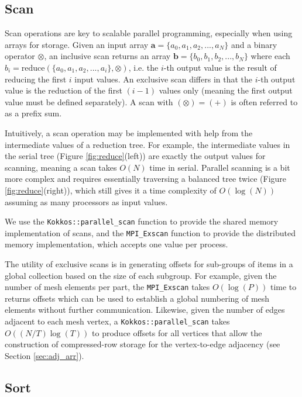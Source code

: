 \subsection{Scan}

Scan operations are key to scalable parallel programming, especially when using
arrays for storage.
Given an input array $\mathbf{a}=\{a_0, a_1, a_2, ..., a_N\}$ and a binary operator
$\otimes$, an inclusive scan returns an array $\mathbf{b}=\{b_0, b_1, b_2, ..., b_N\}$
where each $b_i=\text{reduce}(\{a_0, a_1, a_2, ..., a_i\}, \otimes)$, i.e. the
$i$-th output value is the result of reducing the first $i$ input values.
An exclusive scan differs in that the $i$-th output value is the reduction
of the first $(i-1)$ values only (meaning the first output value must be defined separately).
A scan with $(\otimes)=(+)$ is often referred to as a prefix sum.

Intuitively, a scan operation may be implemented with help from the intermediate
values of a reduction tree.
For example, the intermediate values in the serial tree (Figure \ref{fig:reduce}(left))
are exactly the output values for scanning, meaning a scan takes $O(N)$ time in serial.
Parallel scanning is a bit more complex and requires essentially traversing a
balanced tree twice (Figure \ref{fig:reduce}(right)), which still gives
it a time complexity of $O(\log(N))$ assuming as many processors as input values.

We use the \texttt{Kokkos::parallel\_scan} function to provide the shared
memory implementation of scans, and the \texttt{MPI\_Exscan} function
to provide the distributed memory implementation, which accepts one
value per process.

The utility of exclusive scans is in generating offsets for sub-groups of items in
a global collection based on the size of each subgroup.
For example, given the number of mesh elements per part, the \texttt{MPI\_Exscan}
takes $O(\log(P))$ time to returns offsets which can be used to establish a global
numbering of mesh elements without further communication.
Likewise, given the number of edges adjacent to each mesh vertex, a
\texttt{Kokkos::parallel\_scan} takes $O((N/T)\log(T))$ to produce offsets
for all vertices that allow the construction of compressed-row
storage for the vertex-to-edge adjacency (see Section \ref{sec:adj_arr}).

\subsection{Sort}

